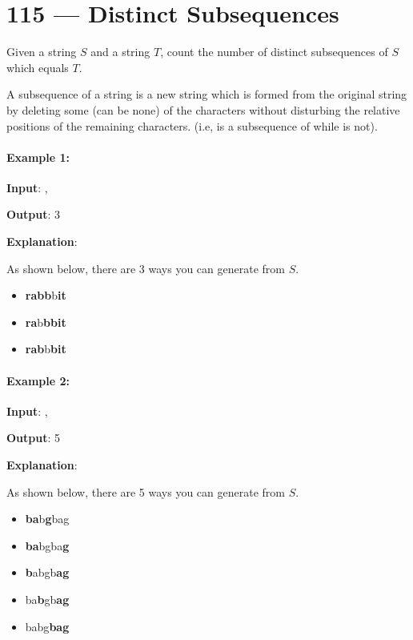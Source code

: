 \section{115 --- Distinct Subsequences}
Given a string $S$ and a string $T$, count the number of distinct subsequences of $S$ which equals $T$.

A subsequence of a string is a new string which is formed from the original string by deleting some (can be none) of the characters without disturbing the relative positions of the remaining characters.  (i.e,  is a subsequence of  while  is not).
\paragraph{Example 1:}
\begin{flushleft}
\textbf{Input}: , 

\textbf{Output}: 3

\textbf{Explanation}:

As shown below, there are 3 ways you can generate  from $S$.
\begin{itemize}
    \item \textbf{rabb}b\textbf{it}
    \item \textbf{ra}b\textbf{bbit}
    \item \textbf{rab}b\textbf{bit}
\end{itemize}
\end{flushleft}
\paragraph{Example 2:}
\begin{flushleft}
\textbf{Input}: , 

\textbf{Output}: 5

\textbf{Explanation}:

As shown below, there are 5 ways you can generate  from $S$.
\begin{itemize}
    \item \textbf{ba}b\textbf{g}bag
    \item \textbf{ba}bgba\textbf{g}
    \item \textbf{b}abgb\textbf{ag}
    \item ba\textbf{b}gb\textbf{ag}
    \item babg\textbf{bag}
    \end{itemize}
\end{flushleft}
